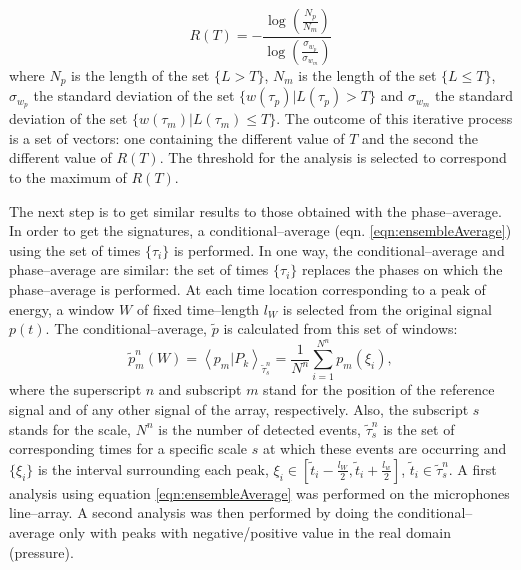 \begin{equation} \label{eqn:tEvaluation}
R(T) = -\frac{\log\left(\frac{N_p}{N_m}\right)}{\log\left(\frac{\sigma_{w_p}}{\sigma_{w_m}}\right)}
\end{equation} 
where $N_p$ is the length of the set $\{L > T\}$, $N_m$ is the length of the set $\{L \leqslant T\}$, $\sigma_{w_p}$ the standard deviation of the set $\{w\left( \tau_p\right) | L\left( \tau_p \right) > T\}$ and $\sigma_{w_m}$ the standard deviation of the set $\{w\left( \tau_m\right) | L\left( \tau_m \right) \leqslant T\}$.
The outcome of this iterative process is a set of vectors: one containing the different value of $T$ and the second the different value of $R(T)$. The threshold for the analysis is selected to correspond to the maximum of $R(T)$.

The next step is to get similar results to those obtained with the phase--average. In order to get the signatures, a conditional--average (eqn. \ref{eqn:ensembleAverage}) using the set of times $\{\tau_{i}\}$ is performed. In one way, the conditional--average and phase--average are similar: the set of times $\{\tau_{i}\}$ replaces the phases on which the phase--average is performed. At each time location corresponding to a peak of energy, a window $W$ of fixed time--length $l_{W}$ is selected from the original signal $p \left( t \right)$. The conditional--average, $\tilde{p}$ is calculated from this set of windows:
\begin{equation} \label{eqn:ensembleAverage}
	\tilde{p}^n_{m}\left( W \right) = \left< p_{m} | P_{k} \right>_{\tilde{\tau}^n_{s}} = \frac{1}{N^n} \sum^{N^n}_{i = 1} p_{m}\left(\xi_{i}\right),
\end{equation}
where the superscript $n$ and subscript $m$ stand for the position of the reference signal and of any other signal of the array, respectively. Also, the subscript $s$ stands for the scale, $N^n$ is the number of detected events, $\tilde{\tau}^n_{s}$ is the set of corresponding times for a specific scale $s$ at which these events are occurring and $\{\xi_{i}\}$ is the interval surrounding each peak, $\xi_{i} \in \left[ \tilde{t}_{i} - \frac{l_W}{2}, \tilde{t}_{i} + \frac{l_w}{2} \right]$, $\tilde{t}_{i} \in \tilde{\tau}^n_{s}$.
A first analysis using equation \ref{eqn:ensembleAverage} was performed on the microphones line--array. A second analysis was then performed by doing the conditional--average only with peaks with negative/positive value in the real domain (pressure).

